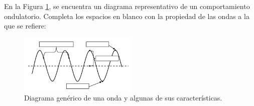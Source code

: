 \question[5] En la Figura \ref{ondas}, se encuentra un diagrama representativo de un comportamiento ondulatorio. Completa los espacios en blanco con la propiedad de las ondas a la que se refiere:
    \begin{figure}[H]
        \centering
        \includegraphics[width =0.5\textwidth ]{Images/onda_blanco.png}
        \caption{Diagrama gen\'erico de una onda y algunas de sus caracter\'isticas.}
        \label{ondas}
    \end{figure}